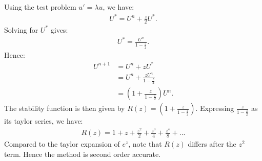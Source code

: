 \documentclass[9pt,oneside,openany]{memoir}
\begin{document}
\begin{exercise}[manual-num={8.4}]
\end{exercise}
\begin{solution}
Using the test problem $u' = \lambda u$, we have:
    \begin{equation*}
    \begin{split}
        U^\ast = U^n + \frac{z}{2}U^\ast.
    \end{split}
    \end{equation*}
Solving for $U^\ast$ gives:
    \begin{equation*}
    \begin{split}
        U^\ast = \frac{U^n}{1 - \frac{z}{2}}.
    \end{split}
    \end{equation*}
Hence:
    \begin{equation*}
    \begin{split}
        U^{n+1} 
        & = U^n + zU^\ast \\
        & = U^n + \frac{zU^n}{1- \frac{z}{2}} \\
        & = \left( 1 + \frac{z}{1 - \frac{z}{2}} \right)U^n.
    \end{split}
    \end{equation*}
The stability function is then given by $R(z) = (1 + \frac{z}{1 - \frac{z}{2}})$. Expressing $\frac{z}{1 - \frac{z}{2}}$ as its taylor series, we have:
    \begin{equation*}
    \begin{split}
        R(z) = 1 + z + \frac{z^2}{2} + \frac{z^3}{4} + \frac{z^4}{8}+...
    \end{split}
    \end{equation*}
Compared to the taylor expansion of $e^z$, note that $R(z)$ differs after the $z^2$ term. Hence the method is second order accurate.
\end{solution}
\begin{exercise}[manual-num={9.1}]
    
\end{exercise}
\end{document}
